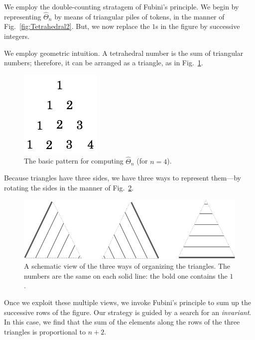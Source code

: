 We employ the double-counting stratagem of Fubini's principle.  We begin by representing $\widehat{\Theta}_n$ by means of triangular piles of tokens, in the manner of Fig.~\ref{fig:Tetrahedral2}.  But, we now replace the $1$s in the figure by successive integers.

\medskip

We employ geometric intuition.  A tetrahedral number is the sum of triangular numbers; therefore, it can be arranged as a triangle, as in Fig.~\ref{fig:Tetrahedral3}.
\begin{figure}[h]
\begin{center}
        \includegraphics[scale=0.35]{FiguresArithmetic/appTetrahedral3}
        \caption{The basic pattern for computing $\widehat{\Theta}_n$ (for $n=4$).}
        \label{fig:Tetrahedral3}
\end{center}
\end{figure}
Because triangles have three sides, we have three ways to represent them---by rotating the sides in the manner of Fig.~\ref{fig:Tetrahedral1}.
\begin{figure}[h]
\begin{center}
        \includegraphics[scale=0.3]{FiguresArithmetic/appTetrahedral1}
        \caption{A schematic view of the three ways of organizing the triangles.
        The numbers are the same on each solid line: the bold one contains the $1$.}
        \label{fig:Tetrahedral1}
\end{center}
\end{figure}
Once we exploit these multiple views, we invoke Fubini's principle to sum up the successive rows of the figure.  Our strategy is guided by a search for an {\em invariant}.  In this case, we find that the sum of the elements along the rows of the three triangles is proportional to $n+2$.

